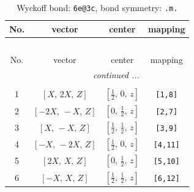 \documentclass[fleqn,8pt]{jsarticle}
\begin{document}
\renewcommand{\arraystretch}{1.2}
\begin{longtable}{cccc}
\caption{Wyckoff bond: {\tt 6e@3c}, bond symmetry: {\tt .m.}}
 \\
 \hline \hline
No. & vector & center & mapping \\ \hline \endfirsthead

\multicolumn{3}{l}{\tablename\ \thetable{}} \\
 \hline \hline
No. & vector & center & mapping \\ \hline \endhead

 \hline \hline
\multicolumn{3}{r}{\footnotesize\it continued ...} \\ \endfoot

 \hline \hline
\multicolumn{3}{r}{} \\ \endlastfoot

1 & $\left[ X,\, 2 X,\, Z \right]$ & $\left[ \frac{1}{2},\, 0,\, z \right]$ & {\tt [1,8]} \\ \hline
2 & $\left[ - 2 X,\, - X,\, Z \right]$ & $\left[ 0,\, \frac{1}{2},\, z \right]$ & {\tt [2,7]} \\ \hline
3 & $\left[ X,\, - X,\, Z \right]$ & $\left[ \frac{1}{2},\, \frac{1}{2},\, z \right]$ & {\tt [3,9]} \\ \hline
4 & $\left[ - X,\, - 2 X,\, Z \right]$ & $\left[ \frac{1}{2},\, 0,\, z \right]$ & {\tt [4,11]} \\ \hline
5 & $\left[ 2 X,\, X,\, Z \right]$ & $\left[ 0,\, \frac{1}{2},\, z \right]$ & {\tt [5,10]} \\ \hline
6 & $\left[ - X,\, X,\, Z \right]$ & $\left[ \frac{1}{2},\, \frac{1}{2},\, z \right]$ & {\tt [6,12]} \\
\end{longtable}
\renewcommand{\arraystretch}{1.2}
\end{document}

